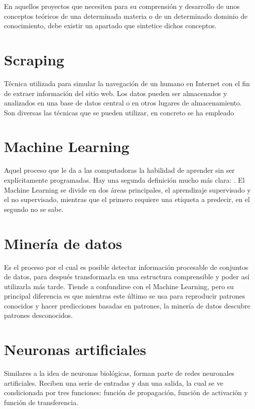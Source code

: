 
En aquellos proyectos que necesiten para su comprensión y desarrollo de unos conceptos teóricos de una determinada materia o de un determinado dominio de conocimiento, debe existir un apartado que sintetice dichos conceptos.


\section{Scraping}
Técnica utilizada para simular  la navegación de un humano en Internet con el fin de extraer información del sitio web. Los datos pueden ser almacenados y analizados en una base de datos central o en otros lugares de almacenamiento.  Son diversas las técnicas que se pueden utilizar, en concreto se ha empleado\cite{_web_2016}

\section{Machine Learning}
Aquel proceso que le da a las computadoras la habilidad de aprender sin ser explícitamente programadas. Hay una segunda definición mucho más clara: . 
El Machine Learning se divide en dos áreas principales, el aprendizaje supervisado y el no supervisado, mientras que el primero requiere una etiqueta a predecir, en el segundo no se sabe.\cite{_machine_learning_2014}

\section{Minería de datos} Es el proceso por el cual es posible detectar información procesable de conjuntos de datos, para después transformarla en una estructura comprensible y poder así utilizarla más tarde.
Tiende a confundirse con el Machine Learning, pero su principal diferencia es que mientras este último se usa para reproducir patrones conocidos y hacer predicciones basadas en patrones, la minería de datos descubre patrones desconocidos.
\section{Neuronas artificiales}
Similares a la idea de neuronas biológicas, forman parte de redes neuronales artificiales. Reciben una serie de entradas y dan una salida, la cual se ve condicionada por tres funciones: función de propagación, función de activación y función de transferencia.

